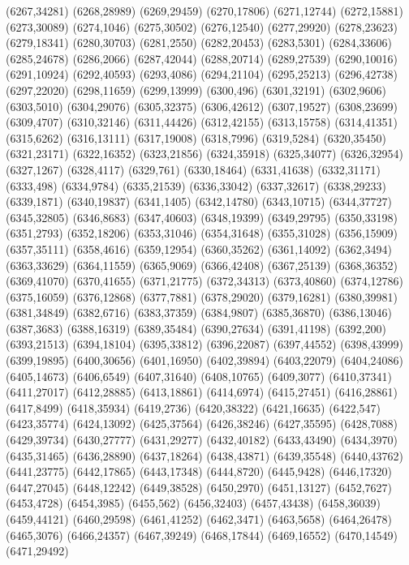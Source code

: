 (6267,34281)
(6268,28989)
(6269,29459)
(6270,17806)
(6271,12744)
(6272,15881)
(6273,30089)
(6274,1046)
(6275,30502)
(6276,12540)
(6277,29920)
(6278,23623)
(6279,18341)
(6280,30703)
(6281,2550)
(6282,20453)
(6283,5301)
(6284,33606)
(6285,24678)
(6286,2066)
(6287,42044)
(6288,20714)
(6289,27539)
(6290,10016)
(6291,10924)
(6292,40593)
(6293,4086)
(6294,21104)
(6295,25213)
(6296,42738)
(6297,22020)
(6298,11659)
(6299,13999)
(6300,496)
(6301,32191)
(6302,9606)
(6303,5010)
(6304,29076)
(6305,32375)
(6306,42612)
(6307,19527)
(6308,23699)
(6309,4707)
(6310,32146)
(6311,44426)
(6312,42155)
(6313,15758)
(6314,41351)
(6315,6262)
(6316,13111)
(6317,19008)
(6318,7996)
(6319,5284)
(6320,35450)
(6321,23171)
(6322,16352)
(6323,21856)
(6324,35918)
(6325,34077)
(6326,32954)
(6327,1267)
(6328,4117)
(6329,761)
(6330,18464)
(6331,41638)
(6332,31171)
(6333,498)
(6334,9784)
(6335,21539)
(6336,33042)
(6337,32617)
(6338,29233)
(6339,1871)
(6340,19837)
(6341,1405)
(6342,14780)
(6343,10715)
(6344,37727)
(6345,32805)
(6346,8683)
(6347,40603)
(6348,19399)
(6349,29795)
(6350,33198)
(6351,2793)
(6352,18206)
(6353,31046)
(6354,31648)
(6355,31028)
(6356,15909)
(6357,35111)
(6358,4616)
(6359,12954)
(6360,35262)
(6361,14092)
(6362,3494)
(6363,33629)
(6364,11559)
(6365,9069)
(6366,42408)
(6367,25139)
(6368,36352)
(6369,41070)
(6370,41655)
(6371,21775)
(6372,34313)
(6373,40860)
(6374,12786)
(6375,16059)
(6376,12868)
(6377,7881)
(6378,29020)
(6379,16281)
(6380,39981)
(6381,34849)
(6382,6716)
(6383,37359)
(6384,9807)
(6385,36870)
(6386,13046)
(6387,3683)
(6388,16319)
(6389,35484)
(6390,27634)
(6391,41198)
(6392,200)
(6393,21513)
(6394,18104)
(6395,33812)
(6396,22087)
(6397,44552)
(6398,43999)
(6399,19895)
(6400,30656)
(6401,16950)
(6402,39894)
(6403,22079)
(6404,24086)
(6405,14673)
(6406,6549)
(6407,31640)
(6408,10765)
(6409,3077)
(6410,37341)
(6411,27017)
(6412,28885)
(6413,18861)
(6414,6974)
(6415,27451)
(6416,28861)
(6417,8499)
(6418,35934)
(6419,2736)
(6420,38322)
(6421,16635)
(6422,547)
(6423,35774)
(6424,13092)
(6425,37564)
(6426,38246)
(6427,35595)
(6428,7088)
(6429,39734)
(6430,27777)
(6431,29277)
(6432,40182)
(6433,43490)
(6434,3970)
(6435,31465)
(6436,28890)
(6437,18264)
(6438,43871)
(6439,35548)
(6440,43762)
(6441,23775)
(6442,17865)
(6443,17348)
(6444,8720)
(6445,9428)
(6446,17320)
(6447,27045)
(6448,12242)
(6449,38528)
(6450,2970)
(6451,13127)
(6452,7627)
(6453,4728)
(6454,3985)
(6455,562)
(6456,32403)
(6457,43438)
(6458,36039)
(6459,44121)
(6460,29598)
(6461,41252)
(6462,3471)
(6463,5658)
(6464,26478)
(6465,3076)
(6466,24357)
(6467,39249)
(6468,17844)
(6469,16552)
(6470,14549)
(6471,29492)
